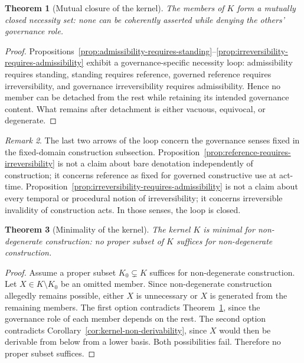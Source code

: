 \documentclass[11pt]{article}
\newtheorem{theorem}{Theorem}[section]
\theoremstyle{definition}
\theoremstyle{remark}
\newtheorem{remark}[theorem]{Remark}
\begin{document}
\begin{theorem}[Mutual closure of the kernel]\label{thm:mutual-closure-kernel}
The members of $K$ form a mutually closed necessity set: none can be coherently asserted while denying the others' governance role.
\end{theorem}

\begin{proof}
Propositions~\ref{prop:admissibility-requires-standing}--\ref{prop:irreversibility-requires-admissibility} exhibit a governance-specific necessity loop: admissibility requires standing, standing requires reference, governed reference requires irreversibility, and governance irreversibility requires admissibility. Hence no member can be detached from the rest while retaining its intended governance content. What remains after detachment is either vacuous, equivocal, or degenerate.
\end{proof}

\begin{remark}
The last two arrows of the loop concern the governance senses fixed in the fixed-domain construction subsection. Proposition~\ref{prop:reference-requires-irreversibility} is not a claim about bare denotation independently of construction; it concerns reference as fixed for governed constructive use at act-time. Proposition~\ref{prop:irreversibility-requires-admissibility} is not a claim about every temporal or procedural notion of irreversibility; it concerns irreversible invalidity of construction acts. In those senses, the loop is closed.
\end{remark}

\begin{theorem}[Minimality of the kernel]\label{thm:minimality-kernel}
The kernel $K$ is minimal for non-degenerate construction: no proper subset of $K$ suffices for non-degenerate construction.
\end{theorem}

\begin{proof}
Assume a proper subset $K_0 \subsetneq K$ suffices for non-degenerate construction. Let $X \in K \setminus K_0$ be an omitted member. Since non-degenerate construction allegedly remains possible, either $X$ is unnecessary or $X$ is generated from the remaining members. The first option contradicts Theorem~\ref{thm:mutual-closure-kernel}, since the governance role of each member depends on the rest. The second option contradicts Corollary~\ref{cor:kernel-non-derivability}, since $X$ would then be derivable from below from a lower basis. Both possibilities fail. Therefore no proper subset suffices.
\end{proof}
\end{document}
